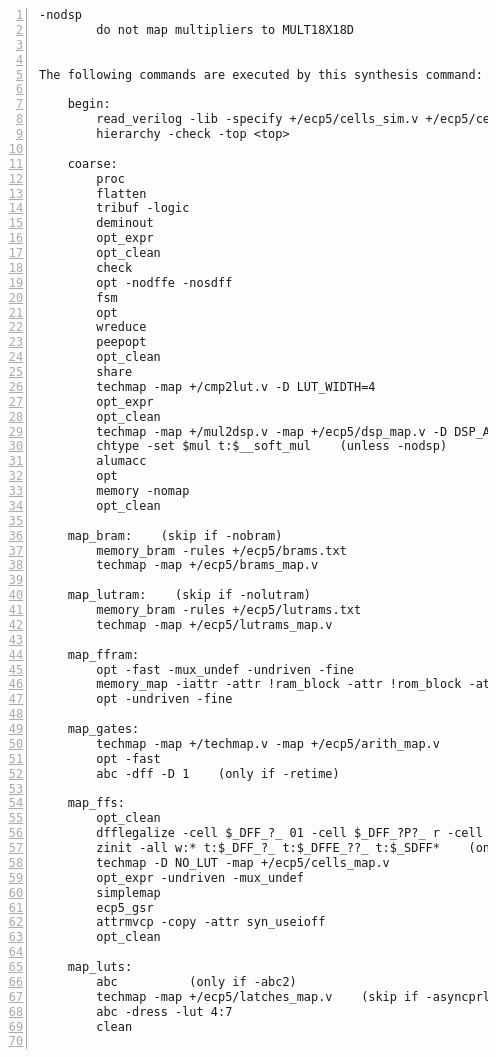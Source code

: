 \begin{lstlisting}[numbers=left,frame=single]
    -nodsp
        do not map multipliers to MULT18X18D


The following commands are executed by this synthesis command:

    begin:
        read_verilog -lib -specify +/ecp5/cells_sim.v +/ecp5/cells_bb.v
        hierarchy -check -top <top>

    coarse:
        proc
        flatten
        tribuf -logic
        deminout
        opt_expr
        opt_clean
        check
        opt -nodffe -nosdff
        fsm
        opt
        wreduce
        peepopt
        opt_clean
        share
        techmap -map +/cmp2lut.v -D LUT_WIDTH=4
        opt_expr
        opt_clean
        techmap -map +/mul2dsp.v -map +/ecp5/dsp_map.v -D DSP_A_MAXWIDTH=18 -D DSP_B_MAXWIDTH=18  -D DSP_A_MINWIDTH=2 -D DSP_B_MINWIDTH=2  -D DSP_NAME=$__MUL18X18    (unless -nodsp)
        chtype -set $mul t:$__soft_mul    (unless -nodsp)
        alumacc
        opt
        memory -nomap
        opt_clean

    map_bram:    (skip if -nobram)
        memory_bram -rules +/ecp5/brams.txt
        techmap -map +/ecp5/brams_map.v

    map_lutram:    (skip if -nolutram)
        memory_bram -rules +/ecp5/lutrams.txt
        techmap -map +/ecp5/lutrams_map.v

    map_ffram:
        opt -fast -mux_undef -undriven -fine
        memory_map -iattr -attr !ram_block -attr !rom_block -attr logic_block -attr syn_ramstyle=auto -attr syn_ramstyle=registers -attr syn_romstyle=auto -attr syn_romstyle=logic
        opt -undriven -fine

    map_gates:
        techmap -map +/techmap.v -map +/ecp5/arith_map.v
        opt -fast
        abc -dff -D 1    (only if -retime)

    map_ffs:
        opt_clean
        dfflegalize -cell $_DFF_?_ 01 -cell $_DFF_?P?_ r -cell $_SDFF_?P?_ r [-cell $_DFFE_??_ 01 -cell $_DFFE_?P??_ r -cell $_SDFFE_?P??_ r] [-cell $_ALDFF_?P_ x -cell $_ALDFFE_?P?_ x] [-cell $_DLATCH_?_ x]    ($_ALDFF_*_ only if -asyncprld, $_DLATCH_* only if not -asyncprld, $_*DFFE_* only if not -nodffe)
        zinit -all w:* t:$_DFF_?_ t:$_DFFE_??_ t:$_SDFF*    (only if -abc9 and -dff)
        techmap -D NO_LUT -map +/ecp5/cells_map.v
        opt_expr -undriven -mux_undef
        simplemap
        ecp5_gsr
        attrmvcp -copy -attr syn_useioff
        opt_clean

    map_luts:
        abc          (only if -abc2)
        techmap -map +/ecp5/latches_map.v    (skip if -asyncprld)
        abc -dress -lut 4:7
        clean


\end{lstlisting}
